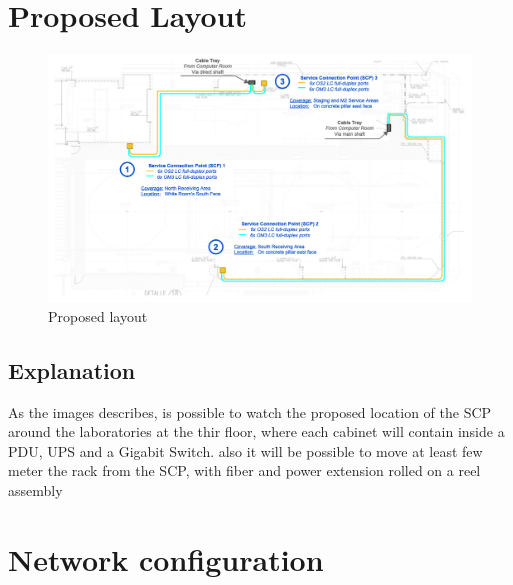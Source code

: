 \newpage
\section{Proposed Layout}

\begin{figure}
  \includegraphics[width=16cm]{images/image-001.png}
  \centering
  \caption{Proposed layout}
\end{figure}

\subsection{Explanation}

As the images describes, is possible to watch the proposed location of the SCP around the laboratories at the thir floor, where each cabinet will contain inside a PDU, UPS and a Gigabit Switch.
also it will be possible to move at least few meter the rack from the SCP, with fiber and power extension rolled on a reel assembly

\newpage
\section{Network configuration}
